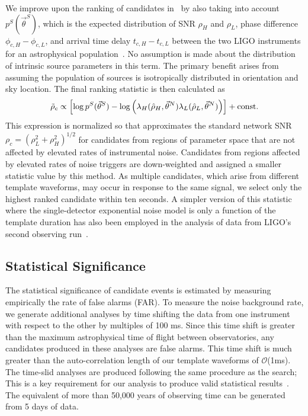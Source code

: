 We improve upon the ranking of candidates in~\cite{Abbott:2016ymx,TheLIGOScientific:2016pea} by also taking into account $p^S(\vec{\theta}^S)$, which is the expected distribution of SNR $\rho_H$ and $\rho_L$, phase difference $\phi_{c, H} - \phi_{c, L}$, and arrival time delay $t_{c,H} - t_{c,L}$ between the two LIGO instruments for an astrophysical population~\citep{Nitz:2017svb}. No assumption is made about the distribution of intrinsic source parameters in this term. The primary benefit arises from assuming the population of sources is isotropically distributed in orientation and sky location. The final ranking statistic \rankingstat{} is then calculated as
\begin{equation}\label{eq:genstat}
  \tilde{\rho}_c \propto \left[ \log p^S(\vec{\theta}^S) - \log \left(\lambda_H(\hat{\rho}_{H},\vec{\theta}^N) \lambda_L(\hat{\rho}_{L}, \vec{\theta}^N)\right) 
  \right] + \mathrm{const.}
\end{equation}
This expression is normalized so that \rankingstat{} approximates the standard network SNR $\rho_c = (\rho_L^2 + \rho_H^2)^{1/2}$ for candidates from regions of parameter space that are not affected by elevated rates of instrumental noise. Candidates from regions affected by elevated rates of noise triggers are down-weighted and assigned a smaller statistic value by this method. As multiple candidates, which arise from different template waveforms, may occur in response to the same signal, we select only the highest ranked candidate within ten seconds. A simpler version of this statistic where the single-detector exponential noise model is only a function of the template duration has also been employed in the analysis of data from LIGO's second observing run~\citep{GW170104, GW170814, Abbott:2017gyy}.

\subsection{Statistical Significance}

The statistical significance of candidate events is estimated by measuring empirically the rate of false alarms (FAR). To measure the noise background rate, we generate additional analyses by time shifting the data from one instrument with respect to the other by multiples of 100 ms. Since this time shift is greater than the maximum astrophysical time of flight between observatories, any candidates produced in these analyses are false alarms. This time shift is much greater than the auto-correlation length of our template waveforms of $\mathcal{O}$(1ms). The time-slid analyses are produced following the same procedure as the search; This is a key requirement for our analysis to produce valid statistical results~\citep{TheLIGOScientific:2016qqj}. The equivalent of more than 50,000 years of observing time can be generated from 5 days of data.

